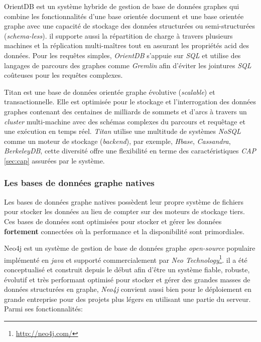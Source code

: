     \textsf{OrientDB} \cite{orientdb} est un système hybride de
    gestion de base de données graphes qui combine les fonctionnalités
    d'une base orientée document et une base orientée graphe avec
    une capacité de stockage des données structurées ou
    semi-structurées (\emph{schema-less}). il supporte aussi la
    répartition de charge à travers plusieurs machines et la
    réplication multi-maîtres tout en assurant les propriétés
    \acrshort{acid} des données. Pour les requêtes simples,
    \emph{OrientDB} s'appuie sur \emph{SQL} et utilise des langages de
    parcours des graphes comme \emph{Gremlin} afin d'éviter les
    jointures \emph{SQL} coûteuses pour les requêtes
    complexes.\bigskip

    \textsf{Titan} \cite{titan} est une base de données orientée
    graphe évolutive (\emph{scalable}) et transactionnelle. Elle est optimisée
    pour le stockage et l'interrogation des données graphes contenant
    des centaines de milliards de sommets et d'arcs à travers un
    \emph{cluster} multi-machine avec des schémas complexes du
    parcours et requêtage et une exécution en temps réel. \emph{Titan}
    utilise une multitude de systèmes \emph{NoSQL} comme un moteur de
    stockage (\emph{backend}), par exemple, \emph{Hbase},
    \emph{Cassandra}, \emph{BerkeleyDB}, cette diversité offre une
    flexibilité en terme des caractéristiques \emph{CAP} \ref{sec:cap}
    assurées par le système.

    \subsubsection{Les bases de données graphe natives}
    \label{sec:graphdb-native}
    Les bases de données graphe natives possèdent leur propre
    système de fichiers pour stocker les données au lieu de compter
    sur des moteurs de stockage tiers. Ces bases de données sont
    optimisées pour stocker et gérer les données \textbf{fortement}
    connectées où la performance et la disponibilité sont
    primordiales.\bigskip

    \textsf{Neo4j} \cite{neo4j} est un système de gestion de base de
    données graphe \textit{open-source} populaire implémenté en
    \textit{java} et supporté commercialement par \textit{Neo
      Technology}\footnote{\url{http://neo4j.com/}}. il a été
    conceptualisé et construit depuis le début afin d'être un système
    fiable, robuste, évolutif et très performant optimisé pour stocker
    et gérer des grandes masses de données structurées en graphe,
    \textit{Neo4j} convient aussi bien pour le déploiement en grande
    entreprise pour des projets plus légers en utilisant une
    partie du serveur. Parmi ses fonctionnalités:\medskip

